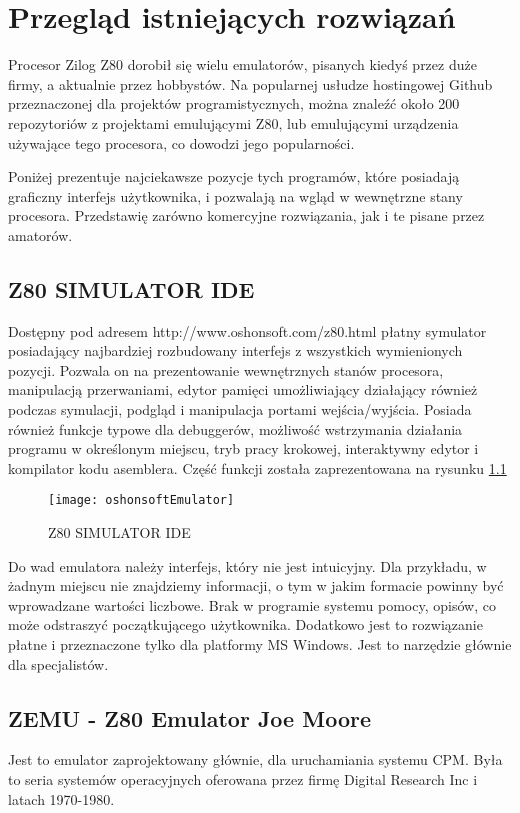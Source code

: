 \chapter{Przegląd istniejących rozwiązań}
	Procesor Zilog Z80 dorobił się wielu emulatorów, pisanych kiedyś przez duże firmy, a aktualnie przez hobbystów. Na popularnej usłudze hostingowej Github przeznaczonej dla projektów programistycznych, można znaleźć około 200 repozytoriów z projektami emulującymi Z80, lub emulującymi urządzenia używające tego procesora, co dowodzi jego popularności.\cite{githubZ80Emulators}   
	
	 Poniżej prezentuje najciekawsze pozycje tych programów, które posiadają graficzny interfejs użytkownika, i pozwalają na wgląd w  wewnętrzne stany procesora. Przedstawię zarówno komercyjne rozwiązania, jak i te pisane przez amatorów.
	
	\section{Z80 SIMULATOR IDE}
	Dostępny pod adresem http://www.oshonsoft.com/z80.html płatny symulator posiadający najbardziej rozbudowany interfejs z wszystkich wymienionych pozycji. Pozwala on na prezentowanie wewnętrznych stanów procesora, manipulacją przerwaniami, edytor pamięci umożliwiający działający również podczas symulacji, podgląd i manipulacja portami wejścia/wyjścia. Posiada również funkcje typowe dla debuggerów, możliwość wstrzymania działania programu w określonym miejscu, tryb pracy krokowej, interaktywny edytor i kompilator kodu asemblera.\cite{oshonsoftEmulator} Część funkcji została zaprezentowana na rysunku \ref{img:oshonsoftEmulator} 
	
	\begin{figure}[h]
		\centering
		\texttt{[image: oshonsoftEmulator]}
		\caption{Z80 SIMULATOR IDE \cite{oshonsoftEmulator}}
		\label{img:oshonsoftEmulator}
	\end{figure}
	
	Do wad emulatora należy interfejs, który nie jest intuicyjny. Dla przykładu, w żadnym miejscu nie znajdziemy informacji, o tym w jakim formacie powinny być wprowadzane wartości liczbowe. Brak w programie systemu pomocy, opisów, co może odstraszyć początkującego użytkownika. Dodatkowo jest to rozwiązanie płatne i przeznaczone tylko dla platformy MS Windows. Jest to narzędzie głównie dla specjalistów.
	
	
	\section{ZEMU - Z80 Emulator Joe Moore}
	Jest to emulator zaprojektowany głównie, dla uruchamiania systemu CPM. Była to seria systemów operacyjnych oferowana przez firmę Digital Research Inc i latach 1970-1980.\cite{cpm}
	
